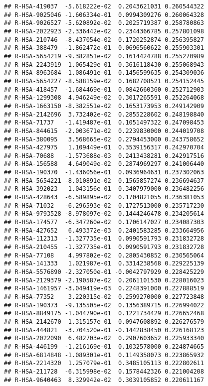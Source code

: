 \documentclass[
]{article}
\begin{document}
\begin{verbatim}
## R-HSA-419037  -5.618222e-02  0.2043621031 0.260544322
## R-HSA-9025046 -1.606334e-01  0.0994309276 0.260064328
## R-HSA-9026527 -5.620892e-02  0.2025719387 0.258780863
## R-HSA-2022923 -2.336442e-02  0.2344366785 0.257801098
## R-HSA-210746  -8.437054e-02  0.1720252874 0.256395827
## R-HSA-388479  -1.862472e-01  0.0696560622 0.255903301
## R-HSA-5654219 -9.382851e-02  0.1614424788 0.255270989
## R-HSA-2243919  1.065429e-01  0.3616118430 0.255068943
## R-HSA-8963684 -1.086491e-01  0.1456599635 0.254309036
## R-HSA-5654227 -8.588159e-02  0.1682708521 0.254152445
## R-HSA-418457  -1.684469e-01  0.0842660360 0.252712903
## R-HSA-1299308  4.946249e-02  0.3017265591 0.252264068
## R-HSA-1663150 -8.382551e-02  0.1653173953 0.249142909
## R-HSA-2142696  3.732402e-02  0.2855228602 0.248198840
## R-HSA-71737   -1.419487e-01  0.1051497322 0.247098453
## R-HSA-844615  -2.003671e-02  0.2239830000 0.244019708
## R-HSA-380095   3.568665e-02  0.2794453000 0.243758652
## R-HSA-427975   1.109449e-01  0.3539156317 0.242970704
## R-HSA-70688   -1.573688e-03  0.2413438281 0.242917516
## R-HSA-156588   4.649049e-02  0.2874969297 0.241006440
## R-HSA-190370  -1.436056e-01  0.0936964631 0.237302063
## R-HSA-5654221 -8.010891e-02  0.1565857274 0.236694637
## R-HSA-392023   1.043156e-01  0.3407979000 0.236482256
## R-HSA-428643  -6.589895e-02  0.1704821055 0.236381053
## R-HSA-71032   -6.296593e-02  0.1727513000 0.235717230
## R-HSA-9793528 -8.978097e-02  0.1444246478 0.234205614
## R-HSA-174577  -6.347260e-02  0.1706147027 0.234087303
## R-HSA-427652   6.493372e-03  0.2401583285 0.233664956
## R-HSA-112313  -1.327735e-01  0.0990591793 0.231832728
## R-HSA-210455  -1.327735e-01  0.0990591793 0.231832728
## R-HSA-77108    4.997802e-02  0.2805430852 0.230565064
## R-HSA-141333   1.021987e-01  0.3314238568 0.229225139
## R-HSA-5576890 -2.327050e-01 -0.0042797929 0.228425229
## R-HSA-2129379 -2.190587e-02  0.2061101530 0.228016023
## R-HSA-1461957 -3.049419e-03  0.2248391000 0.227888519
## R-HSA-77352    3.220315e-02  0.2599270000 0.227723848
## R-HSA-190373  -9.135505e-02  0.1356389715 0.226994022
## R-HSA-8849175 -1.044790e-01  0.1221734429 0.226652468
## R-HSA-2142670 -1.315157e-01  0.0947608892 0.226276579
## R-HSA-444821  -3.704520e-01 -0.1442838450 0.226168123
## R-HSA-2022090  6.482703e-02  0.2907603652 0.225933340
## R-HSA-446199  -1.216169e-01  0.1032578000 0.224874665
## R-HSA-6814848 -1.089301e-01  0.1149358073 0.223865932
## R-HSA-2214320  1.257079e-01  0.3485105113 0.222802611
## R-HSA-211728  -6.315998e-02  0.1578442326 0.221004208
## R-HSA-9640463  8.329942e-02  0.3039105852 0.220611167

\end{verbatim}
\end{document}
